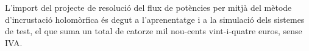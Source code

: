 L'import del projecte de resolució del flux de potències per mitjà del mètode d'incrustació holomòrfica és degut a l'aprenentatge i a la simulació dels sistemes de test, el que suma un total de catorze mil nou-cents vint-i-quatre euros, sense IVA.

